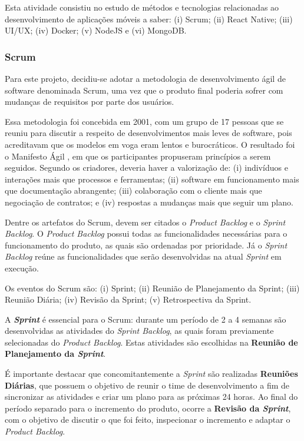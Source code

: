 Esta atividade consistiu no estudo de métodos e tecnologias relacionadas ao desenvolvimento de aplicações móveis a saber: (i) Scrum; (ii) React Native; (iii) UI/UX; (iv) Docker; (v) NodeJS e (vi) MongoDB.

\subsubsection{Scrum} 
Para este projeto, decidiu-se adotar a metodologia de desenvolvimento ágil de software denominada Scrum, uma vez que o produto final poderia sofrer com mudanças de requisitos por parte dos usuários. 

Essa metodologia foi concebida em 2001, com um grupo de 17 pessoas que se reuniu para discutir a respeito de desenvolvimentos mais leves de software, pois acreditavam que os modelos em voga eram lentos e burocráticos. O resultado foi o Manifesto Ágil \citep{agileManifesto}, em que os participantes propuseram princípios a serem seguidos. Segundo os criadores, deveria haver a valorização de: (i) indivíduos e interações mais que processos e ferramentas; (ii) software em funcionamento mais que documentação abrangente; (iii) colaboração com o cliente mais que negociação de contratos; e (iv) respostas a mudanças mais que seguir um plano.

Dentre os artefatos do Scrum, devem ser citados o \textit{Product Backlog} e o \textit{Sprint Backlog}. O \textit{Product Backlog} possui todas as funcionalidades necessárias para o funcionamento do produto, as quais são ordenadas por prioridade. Já o \textit{Sprint Backlog} reúne as funcionalidades que serão desenvolvidas na atual \textit{Sprint} em execução.

Os eventos do Scrum são: (i) Sprint; (ii) Reunião de Planejamento da Sprint; (iii) Reunião Diária; (iv) Revisão da Sprint; (v) Retrospectiva da Sprint.

A \textbf{\textit{Sprint}} é essencial para o Scrum: durante um período de 2 a 4 semanas são desenvolvidas as atividades do \textit{Sprint Backlog}, as quais foram previamente selecionadas do \textit{Product Backlog}. Estas atividades são escolhidas na \textbf{Reunião de Planejamento da \textit{Sprint}}. 

É importante destacar que concomitantemente a \textit{Sprint} são realizadas \textbf{Reuniões Diárias}, que possuem o objetivo de reunir o time de desenvolvimento a fim de sincronizar as atividades e criar um plano para as próximas 24 horas. Ao final do período separado para o incremento do produto, ocorre a \textbf{Revisão da \textit{Sprint}}, com o objetivo de discutir o que foi feito, inspecionar o incremento e adaptar o \textit{Product Backlog}. 

